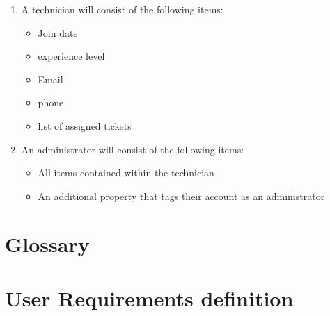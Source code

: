 \documentclass[letterpaper]{article}
\begin{document}
\begin{enumerate}
  \item A  technician will consist of the following items:
        \begin{itemize}
          \item Join date
          \item experience level
          \item Email
          \item phone
          \item list of assigned tickets
        \end{itemize}
  \item An  administrator will consist of the following items:
        \begin{itemize}
          \item All items contained within the technician 
          \item An additional property that tags their account as an administrator
        \end{itemize}
\end{enumerate}
\pagebreak

\section{Glossary}
\glsaddall
\printglossaries
\pagebreak

\section{User Requirements definition}


\pagebreak


\end{document}
